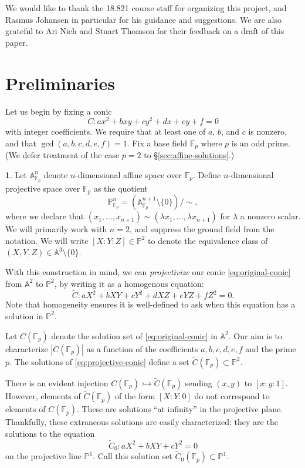 \documentclass[10pt,a4paper]{amsart}
\numberwithin{equation}{section}
\numberwithin{figure}{section}
\numberwithin{table}{section}
\theoremstyle{definition}
\theoremstyle{plain}
\theoremstyle{remark}
\theoremstyle{plain}
\theoremstyle{definition}
\newtheorem{defn}[thm]{\protect\definitionname}
\theoremstyle{plain}
\theoremstyle{plain}
\providecommand{\definitionname}{Definition}
\newcommand{\A}{\mathbb{A}}
\renewcommand{\P}{\mathbb{P}}
\newcommand{\F}{\mathbb{F}}
\begin{document}
	We would like to thank the 18.821 course staff for organizing this project, and Rasmus Johansen in particular for his guidance and suggestions. We are also grateful
	to Ari Nieh and Stuart Thomson for their feedback on a draft of this paper.
	
	
	\section{Preliminaries}\label{sec:projectivization-of-the-problem}
	
	Let us begin by fixing a conic
	\begin{equation}\label{eq:original-conic} 
	C \colon ax^2 + bxy + cy^2 + dx + ey + f = 0 
	\end{equation} 
	with integer coefficients. We require that at least one of 
	$a$, $b$, and $c$ is nonzero, and that $\gcd(a,b,c,d,e,f)=1$.
	Fix a base field $\F_p$ where $p$ is an odd prime. (We defer treatment of the case $p = 2$ to \S\ref{sec:affine-solutions}.)
	\begin{defn}
		Let $\A^n_{\F_p}$ denote $n$-dimensional affine space over $\F_p$. Define 
		$n$-dimensional projective space over $\F_p$ as the quotient
		\[ \P^n_{\F_p} = (\A^{n+1}_{\F_p}\setminus \{0\})/{\sim}, \]
		where we declare that $(x_1,\ldots,x_{n+1}) \sim 
		(\lambda x_1,\ldots,\lambda x_{n+1})$ for $\lambda$ a nonzero scalar. We
		will primarily work with $n = 2$, and suppress the ground field from the 
		notation. We will write $[X:Y:Z]\in \P^2$ to denote the equivalence 
		class of $(X,Y,Z)\in \A^3 \setminus \{0\}$.
	\end{defn}
	
	With this construction in mind, we can \emph{projectivize} our conic
	\eqref{eq:original-conic} from $\A^2$ to $\P^2$, by writing it as a 
	homogenous equation: 
	\begin{equation}\label{eq:projective-conic} 
	\widetilde{C} \colon aX^2 + bXY + cY^2 + dXZ + eYZ + fZ^2 = 0. 
	\end{equation}
	Note that homogeneity ensures it is well-defined to ask when this
	equation has a solution in $\P^2$.
	
	Let $C(\F_p)$ denote the solution set of \eqref{eq:original-conic} in $\A^2$. Our aim
	is to characterize $|C(\F_p)|$ as a function of the coefficients $a,b,c,d,e,f$ and 
	the prime $p$. The solutions of \eqref{eq:projective-conic} define a set
	$\widetilde{C}(\F_p) \subset \P^2$.
	
	There is an evident injection $C(\F_p) \rightarrowtail \widetilde{C}(\F_p)$ sending $(x,y)$ to
	$[x:y:1]$. However, elements of $\widetilde{C}(\F_p)$ of the form $[X:Y:0]$ do not 
	correspond to elements of $C(\F_p)$. 
	These are solutions ``at infinity'' in the projective plane.
	Thankfully, these extraneous solutions are easily characterized: they are the
	solutions to the equation
	\begin{equation}\label{eq:projective-conic-at-infinity} 
	\widetilde{C}_0 \colon aX^2 + bXY + cY^2 = 0
	\end{equation} 
	on the projective line $\P^1$. Call this solution set $\widetilde{C}_0(\F_p)\subset \P^1$.  
	
\end{document}
